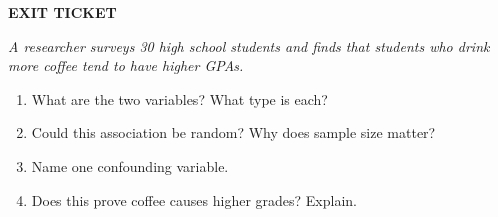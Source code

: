 \documentclass[aspectratio=169, 11pt]{beamer}
\begin{document}
{
\begin{frame}[t, plain]
  \vspace{0.45cm}\par
  \hspace{0.55cm}%
  \begin{minipage}{0.9\textwidth}
    {\color{goldacc}\bfseries\footnotesize\MakeUppercase{Exit Ticket}}
    \vspace{0.4cm}\par
    {\color{skymid}\small\itshape
      A researcher surveys 30 high school students and finds that students
      who drink more coffee tend to have higher GPAs.}\par
    \vspace{0.4cm}
    \small
    \begin{enumerate}
      \setlength{\itemsep}{0.45em}\setlength{\topsep}{0em}
      \item {\color{white}What are the two variables? What type is each?}
      \item {\color{white}Could this association be random? Why does sample size matter?}
      \item {\color{white}Name one confounding variable.}
      \item {\color{white}Does this prove coffee causes higher grades? Explain.}
    \end{enumerate}
  \end{minipage}
\end{frame}
}
\end{document}
